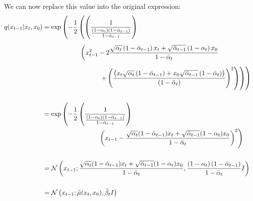 \documentclass{article}
\begin{document}
We can now replace this value into the original expression:
\begin{align}
  q(x_{t-1} | x_t, x_0) &= \exp \left(- \frac{1}{2} \left( \left(\frac{1}{\frac{\left(1 - \alpha_t\right)\left(1 - \bar{\alpha}_{t-1}\right)}{1 - \bar{\alpha}_{t-1}}}\right) \right. \right. \\[5pt]
  & \hspace{2cm} \left(x_{t-1}^2 -2 \frac{\sqrt{\alpha_t} \left(1 - \bar{\alpha}_{t-1}\right) x_t + \sqrt{\bar{\alpha}_{t-1}}\left(1 - \alpha_t\right) x_0}{1 - \bar{\alpha}_t} \right. \notag \\[5pt]
  & \hspace{3cm} \left. \left. \left. + \left(\frac{\left( x_t \sqrt{\alpha_t} \left( 1 - \bar{\alpha}_{t-1} \right) + x_0 \sqrt{\bar{\alpha}_{t-1}} \left( 1 - \bar{\alpha}_t \right) \right)}{\left(1 - \bar{\alpha}_{t}\right)} \right)^2 \right) \right) \right) \\[15pt]
  &= \exp \left(- \frac{1}{2} \left(\frac{1}{\frac{\left(1 - \alpha_t\right)\left(1 - \bar{\alpha}_{t-1}\right)}{1 - \bar{\alpha}_{t-1}}}\right) \right. \\
  & \hspace{3cm} \left. \left( x_{t-1} - \frac{\sqrt{\alpha_t}(1 - \bar{\alpha}_{t-1}) x_t + \sqrt{\bar{\alpha}_{t-1}}(1 - \alpha_t) x_0}{1 - \bar{\alpha}_t} \right)^2  \right) \notag \\[15pt]
  &= \mathcal{N} \left(x_{t-1}; \frac{\sqrt{\alpha_t}(1 - \bar{\alpha}_{t-1}) x_t + \sqrt{\bar{\alpha}_{t-1}}(1 - \alpha_t) x_0}{1 - \bar{\alpha}_t} , \frac{\left(1 - \alpha_t\right)\left(1 - \bar{\alpha}_{t-1}\right)}{1 - \bar{\alpha}_{t}} I \right) \\[15pt]
  &= \mathcal{N} \left(x_{t-1}; \tilde{\mu}(x_t, x_0), \tilde{\beta}_t I \right)
\end{align}
\end{document}

